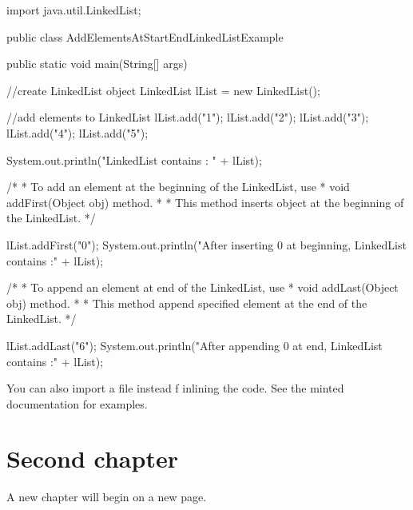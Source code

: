 \documentclass[a4paper,11pt]{report}
\begin{document}
\begin{javacode}
import java.util.LinkedList;
 
public class AddElementsAtStartEndLinkedListExample {
 
  public static void main(String[] args) {
 
    //create LinkedList object
    LinkedList lList = new LinkedList();
   
    //add elements to LinkedList
    lList.add("1");
    lList.add("2");
    lList.add("3");
    lList.add("4");
    lList.add("5");
   
    System.out.println("LinkedList contains : " + lList);
   
    /*
     * To add an element at the beginning of the LinkedList, use
     * void addFirst(Object obj) method.
     *
     * This method inserts object at the beginning of the LinkedList.
     */
   
     lList.addFirst("0");
     System.out.println("After inserting 0 at beginning, LinkedList contains :"
     + lList);
 
    /*
     * To append an element at end of the LinkedList, use
     * void addLast(Object obj) method.
     *
     * This method append specified element at the end of the LinkedList.
     */    
   
     lList.addLast("6");
     System.out.println("After appending 0 at end, LinkedList contains :" + lList);
 
  }
}
\end{javacode}

You can also import a file instead f inlining the code. See the minted documentation for examples.

\chapter{Second chapter}

A new chapter will begin on a new page.

\blindtext
\end{document}
